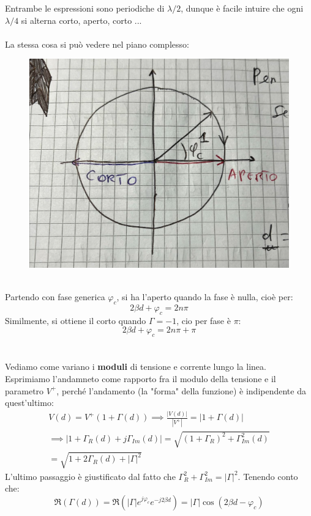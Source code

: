 \documentclass{book}
\begin{document}
    Entrambe le espressioni sono periodiche di $\lambda/2$, dunque è facile intuire che ogni $\lambda/4$ si alterna corto, aperto, corto ... \\ \\
    La stessa cosa si può vedere nel piano complesso:
    \begin{figure}[h!]
        \center  
        \includegraphics[width=0.5\linewidth]{Chapter_two/Chapt2img13.png}
    \end{figure}
    \\ Partendo con fase generica $\varphi_{c}$, si ha l'aperto quando la fase è nulla, cioè per:
    \begin{equation}
        \label{eqn:max_tensione}
        2 \beta d + \varphi_{c} = 2n \pi
    \end{equation}
    Similmente, si ottiene il corto quando $\Gamma=-1$, cio per fase è $\pi$:
    \begin{equation}
        \label{eqn:max_corrente}
        2\beta d + \varphi_{c}=2 n \pi + \pi
    \end{equation}
    \\ \\ 
    Vediamo come variano i \textbf{moduli} di tensione e corrente lungo la linea. Esprimiamo l'andamneto come rapporto fra il modulo
    della tensione e il parametro $V^{+}$, perché l'andamento  (la "forma" della funzione) è indipendente da quest'ultimo:
    \begin{align}
        V(d) = V^{+}(1+\Gamma (d)) \implies \frac{|V(d)|}{|V^{+}|} = |1+\Gamma (d)| \\
        \implies |1+\Gamma_{R}(d)+j \Gamma_{Im}(d)| = \sqrt{(1+\Gamma_{R})^{2}+\Gamma_{Im}^{2}(d)} \\
        = \sqrt{1 + 2 \Gamma_{R}(d)+|\Gamma|^{2}}
    \end{align}
    L'ultimo passaggio è giustificato dal fatto che $\Gamma_{R}^{2}+\Gamma_{Im} ^{2} = |\Gamma|^{2}$. Tenendo conto che:
    \begin{equation}
        \Re(\Gamma (d)) = \Re(|\Gamma|e^{j \varphi_{c}}e^{-j 2 \beta d}) = |\Gamma|\cos(2\beta d - \varphi_{c})
    \end{equation}
\end{document}
